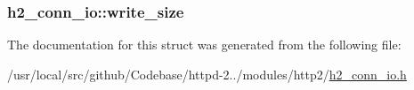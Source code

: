 \subsubsection[{\texorpdfstring{write\+\_\+size}{write_size}}]{ h2\+\_\+conn\+\_\+io\+::write\+\_\+size}\hypertarget{structh2__conn__io_adfe7bdb6ec828f01eb2a3199d0bdcdb4}{}\label{structh2__conn__io_adfe7bdb6ec828f01eb2a3199d0bdcdb4}


The documentation for this struct was generated from the following file\+:\begin{DoxyCompactItemize}
\item 
/usr/local/src/github/\+Codebase/httpd-\/2../modules/http2/\hyperlink{h2__conn__io_8h}{h2\+\_\+conn\+\_\+io.\+h}\end{DoxyCompactItemize}
